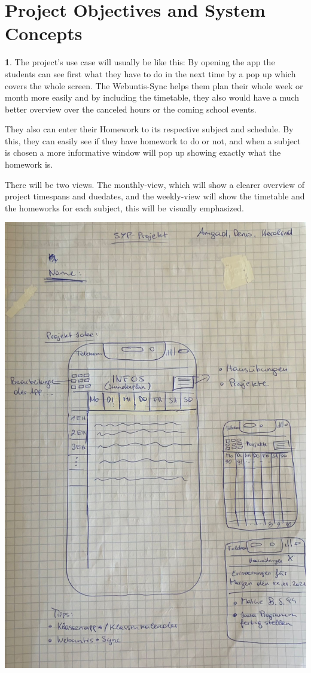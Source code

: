 \documentclass[12pt]{article}
\theoremstyle{definition}
\newtheorem{ourVersion}{ \linebreak}
\begin{document}
\pagebreak

\section{Project Objectives and System Concepts}

\begin{ourVersion}
The project’s use case will usually be like this: 
By opening the app the students can see first what they have to do in the next time by a pop up which covers the whole screen.
The Webuntis-Sync helps them plan their whole week or month more easily and by including the timetable, they also would have a much better overview over the canceled hours or the coming school events.

They also can enter their Homework to its respective subject and schedule.
By this, they can easily see if they have homework to do or not, and when a subject is chosen a more informative window will pop up showing exactly what the homework is.

There will be two views. The monthly-view, which will show a clearer overview of project timespans and duedates, and the weekly-view will show the timetable and the homeworks for each subject, this will be visually emphasized. 

\begin{center}
\includegraphics[scale=0.13]{AppBlueprint.jpeg}
\end{center}

\end{ourVersion}
\end{document}
